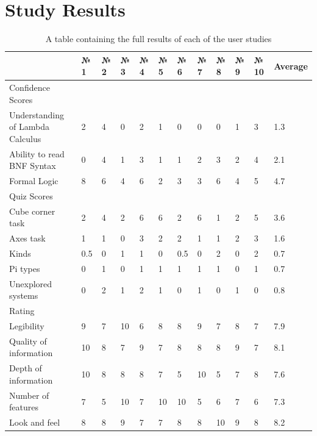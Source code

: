 \documentclass{l4proj}
\begin{document}
\section{Study Results}

\begin{table}[!ht]
    \centering
    \begin{tabular}{|p{3cm}|l|l|l|l|l|l|l|l|l|l|l|}
        \hline
        ~ &  № 1 &  № 2 &  № 3 &  № 4 &  № 5 &  № 6 &  № 7 &  № 8 &  № 9 &  № 10 & Average \\ \hline
        Confidence Scores & ~ & ~ & ~ & ~ & ~ & ~ & ~ & ~ & ~ & ~ & ~ \\ \hline
        Understanding of Lambda Calculus & 2 & 4 & 0 & 2 & 1 & 0 & 0 & 0 & 1 & 3 & 1.3 \\ \hline
        Ability to read BNF Syntax & 0 & 4 & 1 & 3 & 1 & 1 & 2 & 3 & 2 & 4 & 2.1 \\ \hline
        Formal Logic & 8 & 6 & 4 & 6 & 2 & 3 & 3 & 6 & 4 & 5 & 4.7 \\ \hline
        Quiz Scores & ~ & ~ & ~ & ~ & ~ & ~ & ~ & ~ & ~ & ~ & ~ \\ \hline
        Cube corner task & 2 & 4 & 2 & 6 & 6 & 2 & 6 & 1 & 2 & 5 & 3.6 \\ \hline
        Axes task & 1 & 1 & 0 & 3 & 2 & 2 & 1 & 1 & 2 & 3 & 1.6 \\ \hline
        Kinds & 0.5 & 0 & 1 & 1 & 0 & 0.5 & 0 & 2 & 0 & 2 & 0.7 \\ \hline
        Pi types & 0 & 1 & 0 & 1 & 1 & 1 & 1 & 1 & 0 & 1 & 0.7 \\ \hline
        Unexplored systems & 0 & 2 & 1 & 2 & 1 & 0 & 1 & 0 & 1 & 0 & 0.8 \\ \hline
        Rating & ~ & ~ & ~ & ~ & ~ & ~ & ~ & ~ & ~ & ~ & ~ \\ \hline
        Legibility & 9 & 7 & 10 & 6 & 8 & 8 & 9 & 7 & 8 & 7 & 7.9 \\ \hline
        Quality of information & 10 & 8 & 7 & 9 & 7 & 8 & 8 & 8 & 9 & 7 & 8.1 \\ \hline
        Depth of information & 10 & 8 & 8 & 8 & 7 & 5 & 10 & 5 & 7 & 8 & 7.6 \\ \hline
        Number of features & 7 & 5 & 10 & 7 & 10 & 10 & 5 & 6 & 7 & 6 & 7.3 \\ \hline
        Look and feel & 8 & 8 & 9 & 7 & 7 & 8 & 8 & 10 & 9 & 8 & 8.2 \\ \hline
    \end{tabular}
    \caption{A table containing the full results of each of the user studies}
    \label{fig:enter-label}
\end{table}
\end{document}
